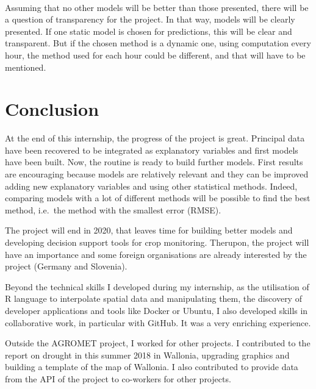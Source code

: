 \documentclass[12pt,twoside]{reedthesis}
\theoremstyle{definition}
\theoremstyle{definition}
\theoremstyle{definition}
\theoremstyle{remark}
\begin{document}
~

Assuming that no other models will be better than those presented, there
will be a question of transparency for the project. In that way, models
will be clearly presented. If one static model is chosen for
predictions, this will be clear and transparent. But if the chosen
method is a dynamic one, using computation every hour, the method used
for each hour could be different, and that will have to be mentioned.

\chapter*{Conclusion}\label{conclusion}

At the end of this internship, the progress of the project is great.
Principal data have been recovered to be integrated as explanatory
variables and first models have been built. Now, the routine is ready to
build further models. First results are encouraging because models are
relatively relevant and they can be improved adding new explanatory
variables and using other statistical methods. Indeed, comparing models
with a lot of different methods will be possible to find the best
method, i.e.~the method with the smallest error (RMSE).

The project will end in 2020, that leaves time for building better
models and developing decision support tools for crop monitoring.
Therupon, the project will have an importance and some foreign
organisations are already interested by the project (Germany and
Slovenia).

Beyond the technical skills I developed during my internship, as the
utilisation of R language to interpolate spatial data and manipulating
them, the discovery of developer applications and tools like Docker or
Ubuntu, I also developed skills in collaborative work, in particular
with GitHub. It was a very enriching experience.

Outside the AGROMET project, I worked for other projects. I contributed
to the report on drought in this summer 2018 in Wallonia, upgrading
graphics and building a template of the map of Wallonia. I also
contributed to provide data from the API of the project to co-workers
for other projects.

\appendix
\end{document}
